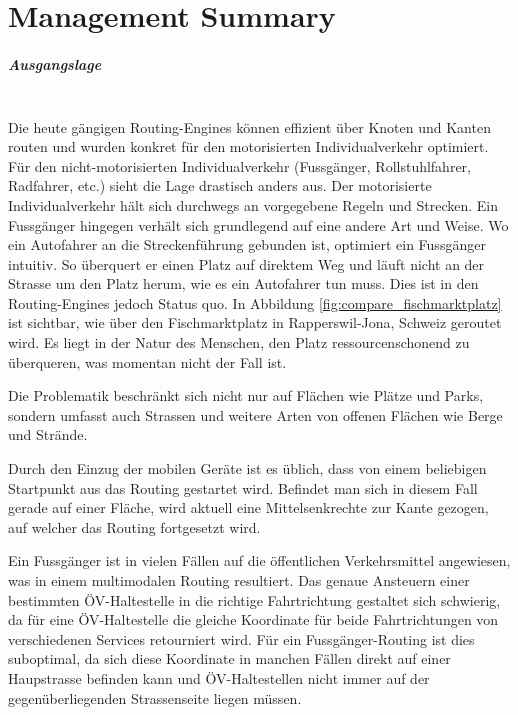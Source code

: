 
\chapter*{Management Summary}

\paragraph{Ausgangslage}~\\
Die heute gängigen Routing-Engines können effizient über Knoten und Kanten routen und wurden konkret für den motorisierten Individualverkehr optimiert. Für den nicht-motorisierten Individualverkehr (Fussgänger, Rollstuhlfahrer, Radfahrer, etc.) sieht die Lage drastisch anders aus. Der motorisierte Individualverkehr hält sich durchwegs an vorgegebene Regeln und Strecken. Ein Fussgänger hingegen verhält sich grundlegend auf eine andere Art und Weise. Wo ein Autofahrer an die Streckenführung gebunden ist, optimiert ein Fussgänger intuitiv. So überquert er einen Platz auf direktem Weg und läuft nicht an der Strasse um den Platz herum, wie es ein Autofahrer tun muss. Dies ist in den Routing-Engines jedoch Status quo. In Abbildung \ref{fig:compare_fischmarktplatz} ist sichtbar, wie über den Fischmarktplatz in Rapperswil-Jona, Schweiz geroutet wird. Es liegt in der Natur des Menschen, den Platz ressourcenschonend zu überqueren, was momentan nicht der Fall ist.

Die Problematik beschränkt sich nicht nur auf Flächen wie Plätze und Parks, sondern umfasst auch Strassen und weitere Arten von offenen Flächen wie Berge und Strände.

Durch den Einzug der mobilen Geräte ist es üblich, dass von einem beliebigen Startpunkt aus das Routing gestartet wird. Befindet man sich in diesem Fall gerade auf einer Fläche, wird aktuell eine Mittelsenkrechte zur Kante gezogen, auf welcher das Routing fortgesetzt wird.

Ein Fussgänger ist in vielen Fällen auf die öffentlichen Verkehrsmittel angewiesen, was in einem multimodalen Routing resultiert. Das genaue Ansteuern einer bestimmten ÖV-Haltestelle in die richtige Fahrtrichtung gestaltet sich schwierig, da für eine ÖV-Haltestelle die gleiche Koordinate für beide Fahrtrichtungen von verschiedenen Services retourniert wird. Für ein Fussgänger-Routing ist dies suboptimal, da sich diese Koordinate in manchen Fällen direkt auf einer Haupstrasse befinden kann und ÖV-Haltestellen nicht immer auf der gegenüberliegenden Strassenseite liegen müssen.

